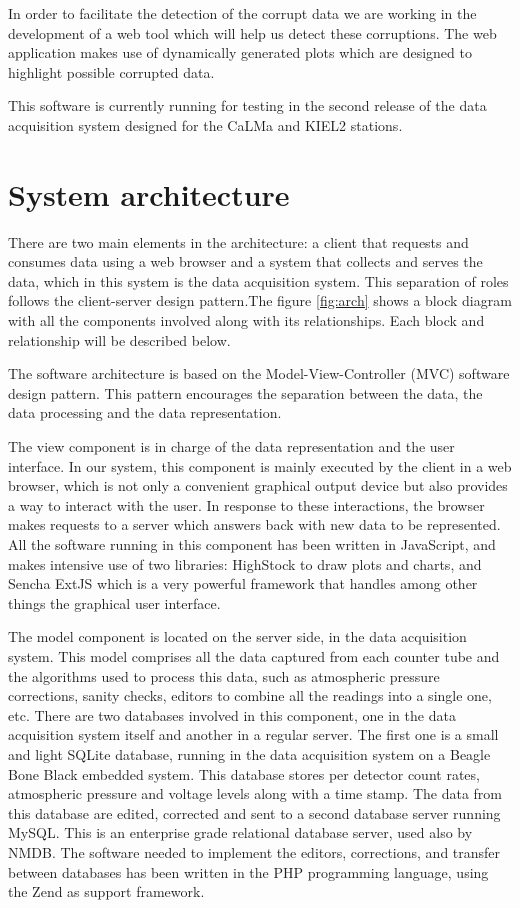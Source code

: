 \documentclass[a4paper]{jpconf}
\begin{document}
In order to facilitate the detection of the corrupt data we are working in the
development of a web tool which will help us detect these corruptions. The web
application makes use of dynamically generated plots which are designed to
highlight possible corrupted data.

This software is currently running for testing in the second release of the data
acquisition system\cite{Garcia2014} designed for the CaLMa\cite{Medina2013} and
KIEL2 stations.


\section{System architecture}

There are two main elements in the architecture: a client that requests and
consumes data using a web browser and a system that collects and serves the
data, which in this system is the data acquisition system. This separation of
roles follows the client-server design pattern\cite{wiki:ClientServer}.The
figure \ref{fig:arch} shows a block diagram with all the components involved
along with its relationships. Each block and relationship will be described
below.

The software architecture is based on the Model-View-Controller (MVC) software
design pattern\cite{wiki:MVC}. This pattern encourages the separation between
the data, the data processing and the data representation. 

The view component is in charge of the data representation and the user
interface. In our system, this component is mainly executed by the client in a
web browser, which is not only a convenient graphical output device but also
provides a way to interact with the user. In response to these interactions, the
browser makes requests to a server which answers back with new data to be
represented. All the software running in this component has been written in
JavaScript, and makes intensive use of two libraries:
HighStock\cite{web:highstock} to draw plots and charts, and Sencha
ExtJS\cite{web:extjs} which is a very powerful framework that handles among
other things the graphical user interface.

The model component is located on the server side, in the data acquisition
system. This model comprises all the data captured from each counter tube and
the algorithms used to process this data, such as atmospheric pressure
corrections, sanity checks, editors to combine all the readings into a single
one, etc. There are two databases involved in this component, one in the data
acquisition system itself and another in a regular server. The first one is a
small and light SQLite database, running in the data acquisition system on a
Beagle Bone Black embedded system\cite{Garcia2014}. This database stores per
detector count rates, atmospheric pressure and voltage levels along with a time
stamp. The data from this database are edited, corrected and sent to a second
database server running MySQL\cite{web:mysql}. This is an enterprise grade
relational database server, used also by NMDB. The software needed to implement
the editors, corrections, and transfer between databases has been written in the PHP programming language, using the Zend\cite{web:zend} as support framework.
\end{document}
